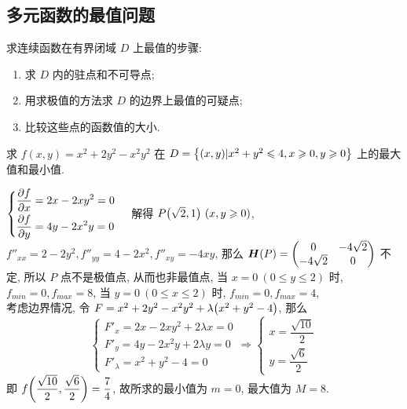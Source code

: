 \subsection{多元函数的最值问题}

求连续函数在有界闭域 $D$ 上最值的步骤:
\begin{enumerate}[label=(\arabic{*})]
    \item 求 $D$ 内的驻点和不可导点;
    \item 用求极值的方法求 $D$ 的边界上最值的可疑点;
    \item 比较这些点的函数值的大小.
\end{enumerate}

\begin{example}
    求 $f(x,y)=x^2+2y^2-x^2y^2$ 在 $D=\qty{(x,y)|x^2+y^2 \leqslant 4, x\geqslant 0, y\geqslant 0}$ 上的最大值和最小值.
\end{example}
\begin{solution}
    $\begin{cases}
        \displaystyle \pdv{f}{x}=2x-2xy^2=0 \\[6pt]
        \displaystyle \pdv{f}{y}=4y-2x^2y=0
    \end{cases}$ 解得 $P\qty(\sqrt{2},1)~(x,y\geqslant 0)$, $f''_{xx}=2-2y^2, f''_{yy}=4-2x^2, f''_{xy}=-4xy$, 那么 $\vb*{H}(P)=\mqty(0&-4\sqrt{2}\\ -4\sqrt{2}&0)$ 不定, 所以 $P$ 点不是极值点, 从而也非最值点, 
    当 $x=0~(0\leqslant y\leqslant 2)$ 时, $f_{min}=0, f_{max}=8$, 当 $y=0~(0\leqslant x\leqslant 2)$ 时, $f_{min}=0, f_{max}=4$,\\ 
    考虑边界情况, 令 $F=x^2+2y^2-x^2y^2+\lambda\qty(x^2+y^2-4)$, 那么 
    $$
    \begin{cases}
        F'_x=2x-2xy^2+2\lambda x=0 \\ 
        F'_y=4y-2x^2y+2\lambda y=0 \\ 
        F'_\lambda=x^2+y^2-4=0
    \end{cases}\Rightarrow \begin{cases}
        x=\dfrac{\sqrt{10}}{2} \\[6pt]
        y=\dfrac{\sqrt{6}}{2}
    \end{cases}
    $$ 即 $f\qty(\dfrac{\sqrt{10}}{2},\dfrac{\sqrt{6}}{2})=\dfrac{7}{4}$, 故所求的最小值为 $m=0$, 最大值为 $M=8.$
\end{solution}

